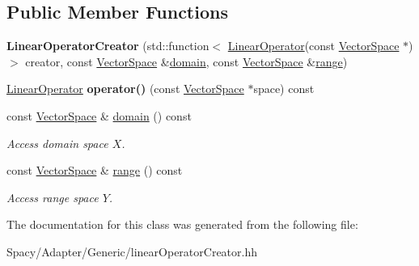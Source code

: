 \subsection*{Public Member Functions}
\begin{DoxyCompactItemize}
\item 
\hypertarget{classSpacy_1_1Generic_1_1LinearOperatorCreator_a212da2dedb9a6b0e8f45b8625364d832}{}{\bfseries Linear\+Operator\+Creator} (std\+::function$<$ \hyperlink{classSpacy_1_1LinearOperator}{Linear\+Operator}(const \hyperlink{classSpacy_1_1VectorSpace}{Vector\+Space} $\ast$)$>$ creator, const \hyperlink{classSpacy_1_1VectorSpace}{Vector\+Space} \&\hyperlink{classSpacy_1_1OperatorBase_a2588f9b3e0188820c4c494e63293dc6f}{domain}, const \hyperlink{classSpacy_1_1VectorSpace}{Vector\+Space} \&\hyperlink{classSpacy_1_1OperatorBase_ab19d3b7a6f290b1079248f1e567e53d6}{range})\label{classSpacy_1_1Generic_1_1LinearOperatorCreator_a212da2dedb9a6b0e8f45b8625364d832}

\item 
\hypertarget{classSpacy_1_1Generic_1_1LinearOperatorCreator_a34e9eee442ba1bffeab9905266500bf6}{}\hyperlink{classSpacy_1_1LinearOperator}{Linear\+Operator} {\bfseries operator()} (const \hyperlink{classSpacy_1_1VectorSpace}{Vector\+Space} $\ast$space) const \label{classSpacy_1_1Generic_1_1LinearOperatorCreator_a34e9eee442ba1bffeab9905266500bf6}

\item 
\hypertarget{classSpacy_1_1OperatorBase_a2588f9b3e0188820c4c494e63293dc6f}{}const \hyperlink{classSpacy_1_1VectorSpace}{Vector\+Space} \& \hyperlink{classSpacy_1_1OperatorBase_a2588f9b3e0188820c4c494e63293dc6f}{domain} () const \label{classSpacy_1_1OperatorBase_a2588f9b3e0188820c4c494e63293dc6f}

\begin{DoxyCompactList}\small\item\em Access domain space $X$. \end{DoxyCompactList}\item 
\hypertarget{classSpacy_1_1OperatorBase_ab19d3b7a6f290b1079248f1e567e53d6}{}const \hyperlink{classSpacy_1_1VectorSpace}{Vector\+Space} \& \hyperlink{classSpacy_1_1OperatorBase_ab19d3b7a6f290b1079248f1e567e53d6}{range} () const \label{classSpacy_1_1OperatorBase_ab19d3b7a6f290b1079248f1e567e53d6}

\begin{DoxyCompactList}\small\item\em Access range space $Y$. \end{DoxyCompactList}\end{DoxyCompactItemize}


The documentation for this class was generated from the following file\+:\begin{DoxyCompactItemize}
\item 
Spacy/\+Adapter/\+Generic/linear\+Operator\+Creator.\+hh\end{DoxyCompactItemize}
